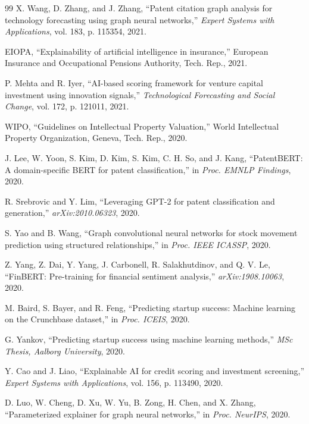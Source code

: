 \documentclass[journal]{IEEEtran}
\begin{document}
\begin{thebibliography}{99}
X. Wang, D. Zhang, and J. Zhang, ``Patent citation graph analysis for technology forecasting using graph neural networks,'' \textit{Expert Systems with Applications}, vol. 183, p. 115354, 2021.

EIOPA, ``Explainability of artificial intelligence in insurance,'' European Insurance and Occupational Pensions Authority, Tech. Rep., 2021.

P. Mehta and R. Iyer, ``AI-based scoring framework for venture capital investment using innovation signals,'' \textit{Technological Forecasting and Social Change}, vol. 172, p. 121011, 2021.

WIPO, ``Guidelines on Intellectual Property Valuation,'' World Intellectual Property Organization, Geneva, Tech. Rep., 2020.

J. Lee, W. Yoon, S. Kim, D. Kim, S. Kim, C. H. So, and J. Kang, ``PatentBERT: A domain-specific BERT for patent classification,'' in \textit{Proc. EMNLP Findings}, 2020.

R. Srebrovic and Y. Lim, ``Leveraging GPT-2 for patent classification and generation,'' \textit{arXiv:2010.06323}, 2020.

S. Yao and B. Wang, ``Graph convolutional neural networks for stock movement prediction using structured relationships,'' in \textit{Proc. IEEE ICASSP}, 2020.

Z. Yang, Z. Dai, Y. Yang, J. Carbonell, R. Salakhutdinov, and Q. V. Le, ``FinBERT: Pre-training for financial sentiment analysis,'' \textit{arXiv:1908.10063}, 2020.

M. Baird, S. Bayer, and R. Feng, ``Predicting startup success: Machine learning on the Crunchbase dataset,'' in \textit{Proc. ICEIS}, 2020.

G. Yankov, ``Predicting startup success using machine learning methods,'' \textit{MSc Thesis, Aalborg University}, 2020.

Y. Cao and J. Liao, ``Explainable AI for credit scoring and investment screening,'' \textit{Expert Systems with Applications}, vol. 156, p. 113490, 2020.

D. Luo, W. Cheng, D. Xu, W. Yu, B. Zong, H. Chen, and X. Zhang, ``Parameterized explainer for graph neural networks,'' in \textit{Proc. NeurIPS}, 2020.


\end{thebibliography}
\end{document}
